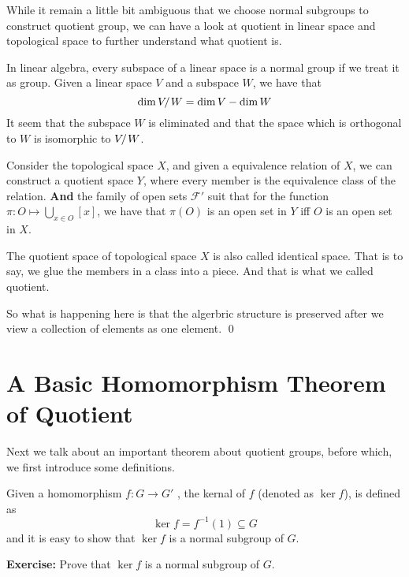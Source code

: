\documentclass[../main.tex]{subfiles}
\begin{document}
\begin{exam}
	While it remain a little bit ambiguous that we choose normal subgroups to construct 
	quotient group, we can have a look at quotient in linear space and topological space 
	to further understand what quotient is.

	In linear algebra, every subspace of a linear space is a normal group if we treat it as group. 
	Given a linear space \(V\) and a subspace \(W\), we have that 
	\[
		\dim V \kern -2pt/\kern 1pt W = \dim V - \dim W
		\]
		It seem that the subspace \(W\) is eliminated and that the space which is orthogonal to \(W\) is isomorphic to 
		\(V \kern -2pt/\kern 1pt W \). 

		Consider the topological space \(X\), and given a equivalence relation of \(X\), we can construct a quotient space 
		\(Y\), where every member is the equivalence class of the relation. \textbf{And} the family of open sets \(\mathscr F'\) suit that for the function \(\pi \colon O \mapsto \bigcup_{ x \in O} [x]\), 
		we have that \(\pi (O)\) is an open set in \(Y\) iff \(O\) is an open set in \(X\). 

		The quotient space of topological space \(X\) is also called identical space. That is to say, we glue the 
		members in a class into a piece. And that is what we called quotient.  

		So what is happening here is that the algerbric structure is preserved after we view a collection of elements as one 
		element. 
		\qed
\end{exam}

\section{A Basic Homomorphism Theorem of Quotient}
\label{sec:A basic homomorphism theorem of quotient}
Next we talk about an important theorem about quotient groups, before which, we first introduce some 
definitions.
\begin{definition}[kernal]\label{def:kernal}
	Given a homomorphism \(f \colon G \to G '\) , the kernal of \(f\) (denoted as \(\ker f\)), is defined as 
	\[
		\ker f = f ^{-1} (1) \subseteq G
		\]
		and it is easy to show that \(\ker f\) is a normal subgroup of \(G\).
\end{definition}
\noindent \textbf{Exercise:} Prove that \(\ker f\) is a normal subgroup of \(G\).
\medskip
\end{document}
